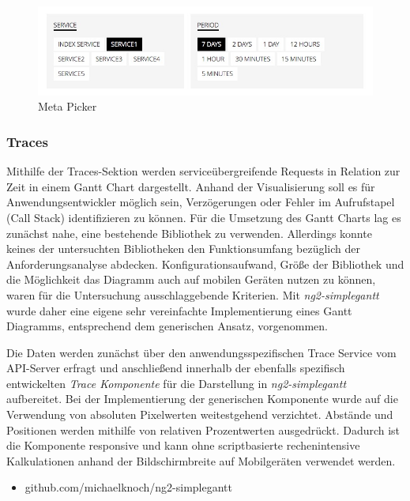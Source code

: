 


\begin{figure}[hptb]
 \centering
 \includegraphics[width=0.8\linewidth]{kapitel4/metapicker.jpg}
 \caption{Meta Picker}
 \label{metapicker}
\end{figure}
\vspace{0.3cm}


\subsubsection{Traces}

Mithilfe der Traces-Sektion werden serviceübergreifende Requests in Relation zur Zeit in einem Gantt Chart dargestellt.
Anhand der Visualisierung soll es für Anwendungsentwickler möglich sein, Verzögerungen oder Fehler im Aufrufstapel (Call Stack) identifizieren zu können.
Für die Umsetzung des Gantt Charts lag es zunächst nahe, eine bestehende Bibliothek zu verwenden.
Allerdings konnte keines der untersuchten Bibliotheken den Funktionsumfang bezüglich der Anforderungsanalyse abdecken.
Konfigurationsaufwand, Größe der Bibliothek und die Möglichkeit das Diagramm auch auf mobilen Geräten nutzen zu können, waren für die Untersuchung ausschlaggebende Kriterien.
Mit \emph{ng2-simplegantt} wurde daher eine eigene sehr vereinfachte Implementierung eines Gantt Diagramms, entsprechend dem generischen Ansatz, vorgenommen.

Die Daten werden zunächst über den anwendungsspezifischen Trace Service vom API-Server erfragt und anschließend innerhalb der ebenfalls spezifisch entwickelten \emph{Trace Komponente}
für die Darstellung in \emph{ng2-simplegantt} aufbereitet.
Bei der Implementierung der generischen Komponente wurde auf die Verwendung von absoluten Pixelwerten weitestgehend verzichtet.
Abstände und Positionen werden mithilfe von relativen Prozentwerten ausgedrückt. Dadurch ist die Komponente responsive und kann
ohne scriptbasierte rechenintensive Kalkulationen anhand der Bildschirmbreite auf Mobilgeräten verwendet werden.

\begin{itemize}
  \item{github.com/michaelknoch/ng2-simplegantt}
\end{itemize}

